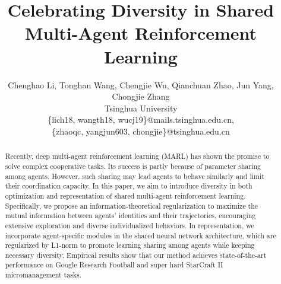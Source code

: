 \documentclass{article}
\title{Celebrating Diversity in Shared Multi-Agent Reinforcement Learning}
\author{%
 Chenghao Li, Tonghan Wang, Chengjie Wu, Qianchuan Zhao, Jun Yang\footnotemark[1] , Chongjie Zhang\footnotemark[1]  \\
    Tsinghua University\\
    \{lich18, wangth18, wucj19\}@mails.tsinghua.edu.cn, \\ \{zhaoqc, yangjun603, chongjie\}@tsinghua.edu.cn
}
\begin{document}
\maketitle

\renewcommand{\thefootnote}{\fnsymbol{footnote}}

\begin{abstract}
Recently, deep multi-agent reinforcement learning (MARL) has shown the promise to solve complex cooperative tasks. Its success is partly because of parameter sharing among agents. However, such sharing may lead agents to behave similarly and limit their coordination capacity. In this paper, we aim to introduce diversity in both optimization and representation of shared multi-agent reinforcement learning. Specifically, we propose an information-theoretical regularization to maximize the mutual information between agents' identities and their trajectories, encouraging extensive exploration and diverse individualized behaviors. In representation, we incorporate agent-specific modules in the shared neural network architecture, which are regularized by L1-norm to promote learning sharing among agents while keeping necessary diversity. Empirical results show that our method achieves state-of-the-art performance on Google Research Football and super hard StarCraft II micromanagement tasks\footnotemark[2].






\end{abstract}
\end{document}

